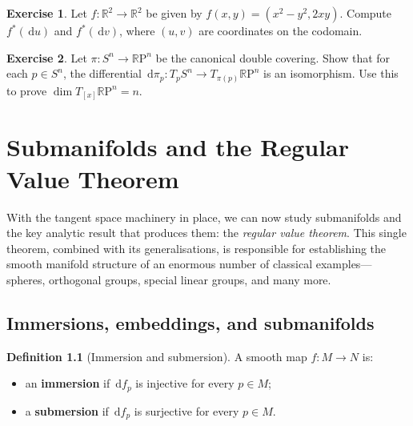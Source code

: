\documentclass[12pt,a4paper,openany]{book}
\theoremstyle{definition}
\newtheorem{definition}[theorem]{Definition}
\newtheorem{exercise}{Exercise}[chapter]
\theoremstyle{remark}
\newcommand{\R}{\mathbb{R}}
\newcommand{\RP}{\mathbb{R}\mathrm{P}}
\newcommand{\dd}{\,\mathrm{d}}
\begin{document}
\begin{exercise}\label{exo:covector-pullback}
Let $f \colon \R^2 \to \R^2$ be given by $f(x, y) = (x^2 - y^2, 2xy)$.
Compute $f^*(\dd u)$ and $f^*(\dd v)$, where $(u, v)$ are coordinates on
the codomain.
\end{exercise}

\begin{exercise}\label{exo:tangent-RP}%
Let $\pi \colon S^n \to \RP^n$ be the canonical double covering.  Show
that for each $p \in S^n$, the differential
$\dd\pi_p \colon T_pS^n \to T_{\pi(p)}\RP^n$ is an isomorphism.
Use this to prove $\dim T_{[x]}\RP^n = n$.
\end{exercise}


\chapter{Submanifolds and the Regular Value Theorem}%
\label{ch:submanifolds}
\minitoc\bigskip

With the tangent space machinery in place, we can now study submanifolds
and the key analytic result that produces them: the \emph{regular value
theorem}.  This single theorem, combined with its generalisations,
is responsible for establishing the smooth manifold structure of an
enormous number of classical examples---spheres, orthogonal groups,
special linear groups, and many more.

\section{Immersions, embeddings, and submanifolds}%
\label{sec:immersion-embedding}

\begin{definition}[Immersion and submersion]\label{def:immersion-submersion}%
A smooth map $f \colon M \to N$ is:
\begin{itemize}
  \item an \textbf{immersion} if $\dd f_p$ is injective for every
    $p \in M$;
  \item a \textbf{submersion} if $\dd f_p$ is surjective for every
    $p \in M$.
\end{itemize}
\end{definition}
\end{document}
